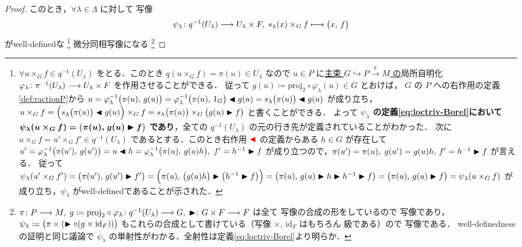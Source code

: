 \documentclass[TQFT_main]{subfiles}
\begin{document}
\begin{proof}
    このとき，$\forall \lambda \in \Lambda$ に対して \cinfty 写像
    \begin{align}
        \label{eq:loctriv-Borel}
        \psi_\lambda \colon q^{-1}(U_\lambda) \longrightarrow U_\lambda \times F,\; s_\lambda(x) \times_G f \longmapsto \bigl( x,\, f \bigr) 
    \end{align}
    がwell-definedな
    \footnote{$\forall u \times_G f \in q^{-1}(U_\lambda)$ をとる．このとき $q(u \times_G f) = \pi(u) \in U_\lambda$ なので $u \in P$ に\underline{主束 $G \hookrightarrow P \xrightarrow{\pi} M$ の}局所自明化 $\varphi_\lambda \colon \pi^{-1}(U_\lambda) \longrightarrow U_\lambda \times F$ を作用させることができる．
        従って $g(u) \coloneqq  \mathrm{proj}_2 \circ \varphi_\lambda (u) \in G$ とおけば，
        $G$ の $P$ への右作用の定義\eqref{def:ractionP}から $u = \varphi_\lambda^{-1} \bigl(\pi(u),\, g(u)\bigr) = \varphi_\lambda^{-1} \bigl( \pi(u),\, 1_G \bigr)  \blacktriangleleft g(u) = s_\lambda \bigl( \pi(u) \bigr)  \blacktriangleleft g(u)$ が成り立ち，$u \times_G f = \Bigl( s_\lambda \bigl( \pi(u) \bigr) \blacktriangleleft g(u) \Bigr) \times_G f =  s_\lambda \bigl( \pi(u) \bigr) \times_G \bigl(g(u) \blacktriangleright f\bigr)$ と書くことができる．
        よって \textbf{$\psi_\lambda$ の定義\eqref{eq:loctriv-Borel}において} $\bm{\psi_\lambda (u \times_G f) = \bigl( \pi(u),\, g(u) \blacktriangleright f \bigr)}$ \textbf{であり}，全ての $q^{-1}(U_\lambda)$ の元の行き先が定義されていることがわかった．
        次に $u \times_G f = u' \times_G f' \in q^{-1}(U_\lambda)$ であるとする．このとき右作用 $\textcolor{red}{\blacktriangleleft}$ の定義からある $h \in G$ が存在して $u' = \varphi_\lambda^{-1} \bigl( \pi(u'),\, g(u') \bigr) = u \blacktriangleleft h = \varphi_\lambda^{-1} \bigl( \pi(u),\, g(u) h \bigr),\; f' = h^{-1} \blacktriangleright f$ が成り立つので，$\pi(u') = \pi(u),\; g(u') = g(u)h,\, f' = h^{-1} \blacktriangleright f$ が言える．
        従って $\psi_\lambda(u' \times_G f') = \bigl( \pi(u'),\, g(u') \blacktriangleright f' \bigr) = \Bigl( \pi(u),\, \bigl(g(u) h\bigr) \blacktriangleright \bigl( h^{-1} \blacktriangleright f \bigr) \Bigr) = \bigl( \pi(u),\, g(u) \blacktriangleright h \blacktriangleright h^{-1} \blacktriangleright f \bigr) = \bigl( \pi(u),\, g(u) \blacktriangleright f \bigr) = \psi_\lambda (u \times_G f)$ が成り立ち，$\psi_\lambda$ がwell-definedであることが示された．
    }
    微分同相写像になる
    \footnote{
        $\pi \colon P \longrightarrow M,\; g \coloneqq \mathrm{proj}_2 \circ \varphi_\lambda \colon q^{-1}(U_\lambda) \longrightarrow G,\; \blacktriangleright \colon G \times F \longrightarrow F$ は全て \cinfty 写像の合成の形をしているので \cinfty 写像であり，$\psi_\lambda \coloneqq \bigl(\pi \times (\blacktriangleright \circ (g \times \mathrm{id}_F))\bigr)$ もこれらの合成として書けている（写像 $\times,\, \mathrm{id}_F$ はもちろん \cinfty 級である）ので \cinfty 写像である．
        well-definednessの証明と同じ議論で $\psi_\lambda$ の単射性がわかる．全射性は定義\eqref{eq:loctriv-Borel}より明らか．
}
\end{proof}
\end{document}
